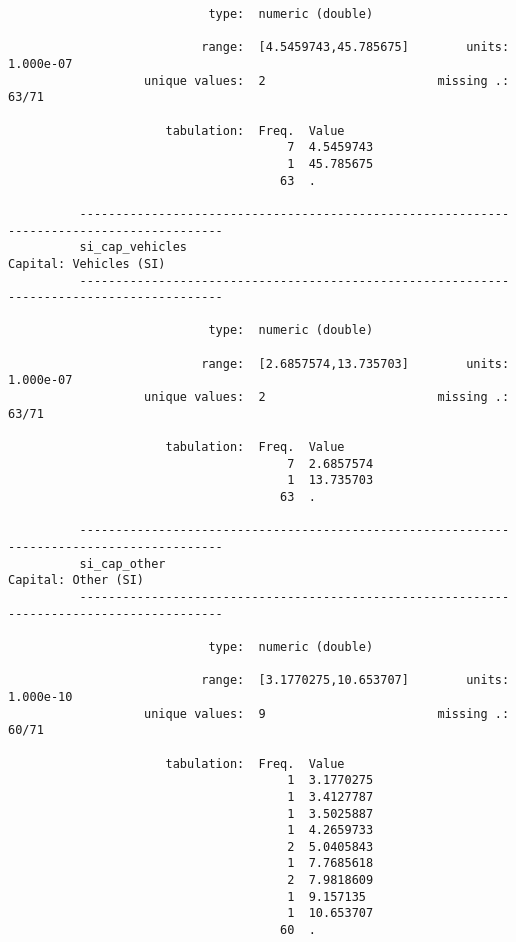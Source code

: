 \documentclass{article}
\begin{document}
\begin{verbatim}
                            type:  numeric (double)
          
                           range:  [4.5459743,45.785675]        units:  1.000e-07
                   unique values:  2                        missing .:  63/71
          
                      tabulation:  Freq.  Value
                                       7  4.5459743
                                       1  45.785675
                                      63  .
          
          ------------------------------------------------------------------------------------------
          si_cap_vehicles                                                     Capital: Vehicles (SI)
          ------------------------------------------------------------------------------------------
          
                            type:  numeric (double)
          
                           range:  [2.6857574,13.735703]        units:  1.000e-07
                   unique values:  2                        missing .:  63/71
          
                      tabulation:  Freq.  Value
                                       7  2.6857574
                                       1  13.735703
                                      63  .
          
          ------------------------------------------------------------------------------------------
          si_cap_other                                                           Capital: Other (SI)
          ------------------------------------------------------------------------------------------
          
                            type:  numeric (double)
          
                           range:  [3.1770275,10.653707]        units:  1.000e-10
                   unique values:  9                        missing .:  60/71
          
                      tabulation:  Freq.  Value
                                       1  3.1770275
                                       1  3.4127787
                                       1  3.5025887
                                       1  4.2659733
                                       2  5.0405843
                                       1  7.7685618
                                       2  7.9818609
                                       1  9.157135
                                       1  10.653707
                                      60  .
          

\end{verbatim}
\end{document}
